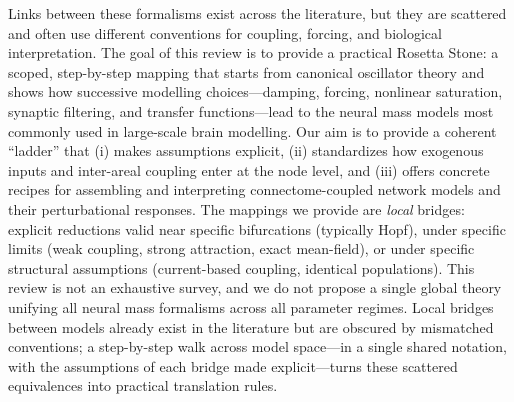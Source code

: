 \documentclass[12pt]{article}
\numberwithin{equation}{section}
\newcommand{\rev}[1]{\begingroup\color{blue}#1\endgroup}
\begin{document}
\rev{Links between these formalisms exist across the literature, but they are scattered and often use different conventions for coupling, forcing, and biological interpretation. The goal of this review is to provide a practical Rosetta Stone: a scoped, step-by-step mapping that starts from canonical oscillator theory and shows how successive modelling choices—damping, forcing, nonlinear saturation, synaptic filtering, and transfer functions—lead to the neural mass models most commonly used in large-scale brain modelling. Our aim is to provide a coherent “ladder” that (i) makes assumptions explicit, (ii) standardizes how exogenous inputs and inter-areal coupling enter at the node level, and (iii) offers concrete recipes for assembling and interpreting connectome-coupled network models and their perturbational responses.
The mappings we provide are \emph{local} bridges: explicit reductions valid near specific bifurcations (typically Hopf), under specific limits (weak coupling, strong attraction, exact mean-field), or under specific structural assumptions (current-based coupling, identical populations). This review is not an exhaustive survey, and we do not propose a single global theory unifying all neural mass formalisms across all parameter regimes. Local bridges between models already exist in the literature but are obscured by mismatched conventions; a step-by-step walk across model space---in a single shared notation, with the assumptions of each bridge made explicit---turns these scattered equivalences into practical translation rules.}
\end{document}
